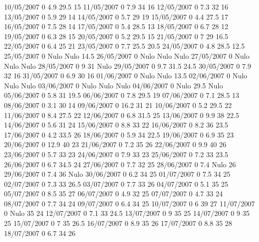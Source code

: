 10/05/2007  0      4.9    29.5   15 
11/05/2007  0      7.9    34     16 
12/05/2007  0      7.3    32     16 
13/05/2007  0      5.9    29     14 
14/05/2007  0      5.7    29     19 
15/05/2007  0      4.4    27.5   17 
16/05/2007  0      7.5    28     14 
17/05/2007  0      5.4    28.5   13 
18/05/2007  0      6.7    28     12 
19/05/2007  0      6.3    28     15 
20/05/2007  0      5.2    29.5   15 
21/05/2007  0      7      29     16.5 
22/05/2007  0      6.4    25     21 
23/05/2007  0      7.7    25.5   20.5 
24/05/2007  0      4.8    28.5   12.5 
25/05/2007  0     Nulo   Nulo    14.5 
26/05/2007  0     Nulo   Nulo   Nulo
27/05/2007  0     Nulo   Nulo   Nulo
28/05/2007  0      9      31    Nulo
29/05/2007  0      9.7    31.5   24.5 
30/05/2007  0      7.9    32     16 
31/05/2007  0      6.9    30     16 
01/06/2007  0     Nulo   Nulo    13.5 
02/06/2007  0     Nulo   Nulo   Nulo
03/06/2007  0     Nulo   Nulo   Nulo
04/06/2007  0     Nulo    29.5  Nulo
05/06/2007  0      5.8    31     19.5 
06/06/2007  0      7.8    29.5   19 
07/06/2007  0      7.1    28.5   13 
08/06/2007  0      3.1    30     14 
09/06/2007  0      16.2   31     21 
10/06/2007  0      5.2    29.5   22 
11/06/2007  0      8.4    27.5   22 
12/06/2007  0      6.8    31.5   25 
13/06/2007  0      9.9    38     22.5 
14/06/2007  0      5.6    31     24 
15/06/2007  0      8.8    33     22 
16/06/2007  0      8.2    36     23.5 
17/06/2007  0      4.2    33.5   26 
18/06/2007  0      5.9    34     22.5 
19/06/2007  0      6.9    35     23 
20/06/2007  0      12.9   40     23 
21/06/2007  0      7.2    35     26 
22/06/2007  0      9.9    40     26 
23/06/2007  0      5.7    33     23 
24/06/2007  0      7.9    33     23 
25/06/2007  0      7.2    33     23.5 
26/06/2007  0      6.7    34.5   24 
27/06/2007  0      7.7    32     25 
28/06/2007  0      7.4   Nulo    26 
29/06/2007  0      7.4    36    Nulo
30/06/2007  0      6.2    34     25 
01/07/2007  0      7.5    34     25 
02/07/2007  0      7.3    33     26.5 
03/07/2007  0      7.7    33     26 
04/07/2007  0      5.1    35     25 
05/07/2007  0      8.5    35     27 
06/07/2007  0      4.9    32     25 
07/07/2007  0      4.7    33     24 
08/07/2007  0      7.7    34     24 
09/07/2007  0      6.4    34     25 
10/07/2007  0      6      39     27 
11/07/2007  0     Nulo    35     24 
12/07/2007  0      7.1    33     24.5 
13/07/2007  0      9      35     25 
14/07/2007  0      9      35     25 
15/07/2007  0      7      35     26.5 
16/07/2007  0      8.9    35     26 
17/07/2007  0      8.8    35     28 
18/07/2007  0      6.7    34     26 
